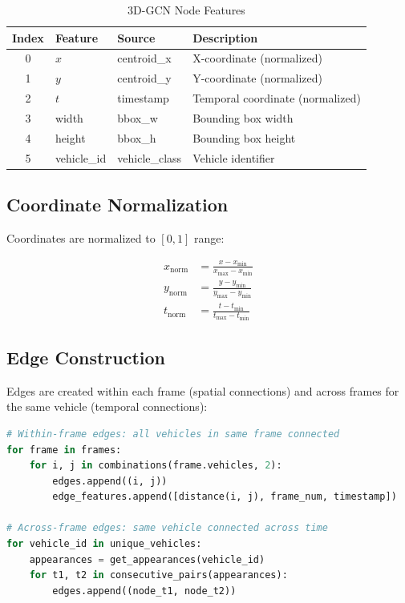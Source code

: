 \begin{table}[H]
\centering
\caption{3D-GCN Node Features}
\label{tab:3dgcn_features}
\begin{tabular}{clll}
\toprule
\textbf{Index} & \textbf{Feature} & \textbf{Source} & \textbf{Description} \\
\midrule
0 & $x$ & centroid\_x & X-coordinate (normalized) \\
1 & $y$ & centroid\_y & Y-coordinate (normalized) \\
2 & $t$ & timestamp & Temporal coordinate (normalized) \\
3 & width & bbox\_w & Bounding box width \\
4 & height & bbox\_h & Bounding box height \\
5 & vehicle\_id & vehicle\_class & Vehicle identifier \\
\bottomrule
\end{tabular}
\end{table}

\subsection{Coordinate Normalization}

Coordinates are normalized to $[0, 1]$ range:

\begin{align}
    x_{\text{norm}} &= \frac{x - x_{\min}}{x_{\max} - x_{\min}} \\
    y_{\text{norm}} &= \frac{y - y_{\min}}{y_{\max} - y_{\min}} \\
    t_{\text{norm}} &= \frac{t - t_{\min}}{t_{\max} - t_{\min}}
\end{align}

\subsection{Edge Construction}

Edges are created within each frame (spatial connections) and across frames for the same vehicle (temporal connections):

\begin{lstlisting}[language=Python, caption={Edge construction for 3D-GCN}]
# Within-frame edges: all vehicles in same frame connected
for frame in frames:
    for i, j in combinations(frame.vehicles, 2):
        edges.append((i, j))
        edge_features.append([distance(i, j), frame_num, timestamp])

# Across-frame edges: same vehicle connected across time
for vehicle_id in unique_vehicles:
    appearances = get_appearances(vehicle_id)
    for t1, t2 in consecutive_pairs(appearances):
        edges.append((node_t1, node_t2))
\end{lstlisting}

